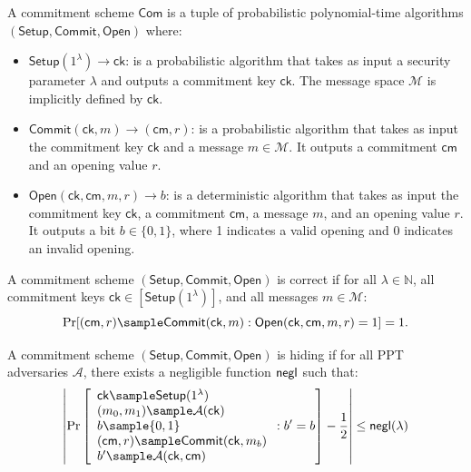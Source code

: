 \begin{definition}\label{def:commitmentscheme}
A commitment scheme $\mathsf{Com}$ is a tuple of probabilistic polynomial-time algorithms $(\mathsf{Setup}, \mathsf{Commit}, \mathsf{Open})$ where:
\begin{itemize}
    \item $\mathsf{Setup}(1^\lambda) \rightarrow \mathsf{ck}$: is a probabilistic algorithm that takes as input a security parameter $\lambda$ and outputs a commitment key $\mathsf{ck}$. The message space $\mathcal{M}$ is implicitly defined by $\mathsf{ck}$.
    
    \item $\mathsf{Commit}(\mathsf{ck}, m) \rightarrow (\mathsf{cm}, r)$: is a probabilistic algorithm that takes as input the commitment key $\mathsf{ck}$ and a message $m \in \mathcal{M}$. It outputs a commitment $\mathsf{cm}$ and an opening value $r$.
    
    \item $\mathsf{Open}(\mathsf{ck}, \mathsf{cm}, m, r) \rightarrow b$: is a deterministic algorithm that takes as input the commitment key $\mathsf{ck}$, a commitment $\mathsf{cm}$, a message $m$, and an opening value $r$. It outputs a bit $b \in \{0,1\}$, where 1 indicates a valid opening and 0 indicates an invalid opening.
\end{itemize}
\end{definition}

\begin{definition}[Correctness]
A commitment scheme $(\mathsf{Setup}, \mathsf{Commit}, \mathsf{Open})$ is correct if for all $\lambda \in \mathbb{N}$, all commitment keys $\mathsf{ck} \in [\mathsf{Setup}(1^\lambda)]$, and all messages $m \in \mathcal{M}$:
$$\Pr[(\mathsf{cm}, r) \sample \mathsf{Commit}(\mathsf{ck}, m) : \mathsf{Open}(\mathsf{ck}, \mathsf{cm}, m, r) = 1] = 1.$$
\end{definition}

\begin{definition}[Hiding]
A commitment scheme $(\mathsf{Setup}, \mathsf{Commit}, \mathsf{Open})$ is hiding if for all PPT adversaries $\mathcal{A}$, there exists a negligible function $\mathsf{negl}$ such that:
$$\left|\Pr\left[\begin{array}{l}
    \mathsf{ck} \sample \mathsf{Setup}(1^\lambda) \\
    (m_0, m_1) \sample \mathcal{A}(\mathsf{ck}) \\
    b \sample \{0,1\} \\
    (\mathsf{cm}, r) \sample \mathsf{Commit}(\mathsf{ck}, m_b) \\
    b' \sample \mathcal{A}(\mathsf{ck}, \mathsf{cm})
\end{array} : b' = b\right] - \frac{1}{2}\right| \leq \negl(\lambda)$$
\end{definition}

